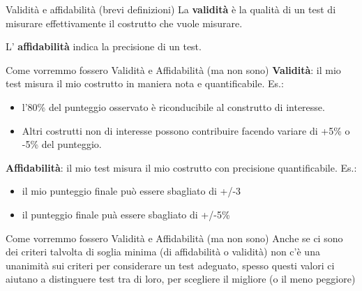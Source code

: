 \documentclass[
  ignorenonframetext,
]{beamer}
\providecommand{\tightlist}{%
  \setlength{\itemsep}{0pt}\setlength{\parskip}{0pt}}
\begin{document}
\begin{frame}{Validità e affidabilità (brevi definizioni)}
\label{validituxe0-e-affidabilituxe0-brevi-definizioni}
La \textbf{validità} è la qualità di un test di misurare effettivamente
il costrutto che vuole misurare.

L' \textbf{affidabilità} indica la precisione di un test.
\end{frame}

\begin{frame}{Come vorremmo fossero Validità e Affidabilità (ma non
sono)}
\label{come-vorremmo-fossero-validituxe0-e-affidabilituxe0-ma-non-sono}
\textbf{Validità}: il mio test misura il mio costrutto in maniera nota e
quantificabile. Es.:

\begin{itemize}
\tightlist
\item
  l'80\% del punteggio osservato è riconducibile al construtto di
  interesse.
\item
  Altri costrutti non di interesse possono contribuire facendo variare
  di +5\% o -5\% del punteggio.
\end{itemize}

\vfill
\pause

\textbf{Affidabilità}: il mio test misura il mio costrutto con
precisione quantificabile. Es.:

\begin{itemize}
\tightlist
\item
  il mio punteggio finale può essere sbagliato di +/-3
\item
  il punteggio finale puà essere sbagliato di +/-5\%
\end{itemize}
\end{frame}

\begin{frame}{Come vorremmo fossero Validità e Affidabilità (ma non
sono)}
\label{come-vorremmo-fossero-validituxe0-e-affidabilituxe0-ma-non-sono-1}
Anche se ci sono dei criteri talvolta di soglia minima (di affidabilità
o validità) non c'è una unanimità sui criteri per considerare un test
adeguato, spesso questi valori ci aiutano a distinguere test tra di
loro, per scegliere il migliore (o il meno peggiore)

\vfill

\begin{center}
\end{center}
\end{frame}
\end{document}
